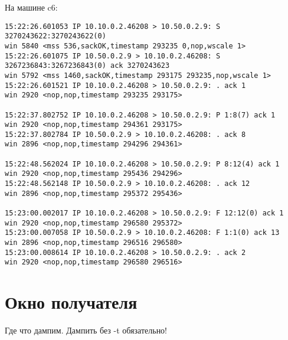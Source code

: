 \documentclass[a4paper,12pt]{article}
\begin{document}
На машине c6:
\begin{Verbatim}
15:22:26.601053 IP 10.10.0.2.46208 > 10.50.0.2.9: S 3270243622:3270243622(0) 
win 5840 <mss 536,sackOK,timestamp 293235 0,nop,wscale 1>
15:22:26.601075 IP 10.50.0.2.9 > 10.10.0.2.46208: S 3267236843:3267236843(0) ack 3270243623 
win 5792 <mss 1460,sackOK,timestamp 293175 293235,nop,wscale 1>
15:22:26.601521 IP 10.10.0.2.46208 > 10.50.0.2.9: . ack 1 
win 2920 <nop,nop,timestamp 293235 293175>

15:22:37.802752 IP 10.10.0.2.46208 > 10.50.0.2.9: P 1:8(7) ack 1 
win 2920 <nop,nop,timestamp 294361 293175>
15:22:37.802784 IP 10.50.0.2.9 > 10.10.0.2.46208: . ack 8 
win 2896 <nop,nop,timestamp 294296 294361>

15:22:48.562024 IP 10.10.0.2.46208 > 10.50.0.2.9: P 8:12(4) ack 1 
win 2920 <nop,nop,timestamp 295436 294296>
15:22:48.562148 IP 10.50.0.2.9 > 10.10.0.2.46208: . ack 12 
win 2896 <nop,nop,timestamp 295372 295436>

15:23:00.002017 IP 10.10.0.2.46208 > 10.50.0.2.9: F 12:12(0) ack 1 
win 2920 <nop,nop,timestamp 296580 295372>
15:23:00.007058 IP 10.50.0.2.9 > 10.10.0.2.46208: F 1:1(0) ack 13 
win 2896 <nop,nop,timestamp 296516 296580>
15:23:00.008614 IP 10.10.0.2.46208 > 10.50.0.2.9: . ack 2 
win 2920 <nop,nop,timestamp 296580 296516>
\end{Verbatim}

\section{Окно получателя}

Где что дампим.  Дампить без -t обязательно!
\end{document}
